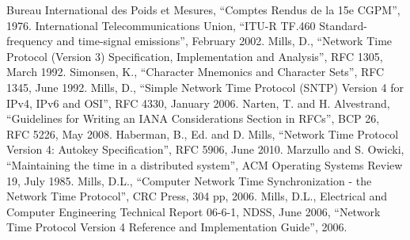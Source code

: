 \begingroup
  \renewcommand{\chapter}[2]{}
  \begin{thebibliography}{}
     Bureau International des Poids et Mesures, ``Comptes Rendus de la 15e CGPM'', 1976.
     International Telecommunications Union, ``ITU-R TF.460 Standard-frequency and time-signal emissions'', February 2002.
     Mills, D., ``Network Time Protocol (Version 3) Specification, Implementation and Analysis'', RFC 1305, March 1992.
     Simonsen, K., ``Character Mnemonics and Character Sets'', RFC 1345, June 1992.
     Mills, D., ``Simple Network Time Protocol (SNTP) Version 4 for IPv4, IPv6 and OSI'', RFC 4330, January 2006.
     Narten, T. and H. Alvestrand, ``Guidelines for Writing an IANA Considerations Section in RFCs'', BCP 26, RFC 5226, May 2008.
     Haberman, B., Ed. and D. Mills, ``Network Time Protocol Version 4: Autokey Specification'', RFC 5906, June 2010.
     Marzullo and S. Owicki, ``Maintaining the time in a distributed system'', ACM Operating Systems Review 19, July 1985.
     Mills, D.L., ``Computer Network Time Synchronization - the Network Time Protocol'', CRC Press, 304 pp, 2006.
     Mills, D.L., Electrical and Computer Engineering Technical Report 06-6-1, NDSS, June 2006, ``Network Time Protocol Version 4 Reference and Implementation Guide'', 2006.
  \end{thebibliography}
\endgroup
